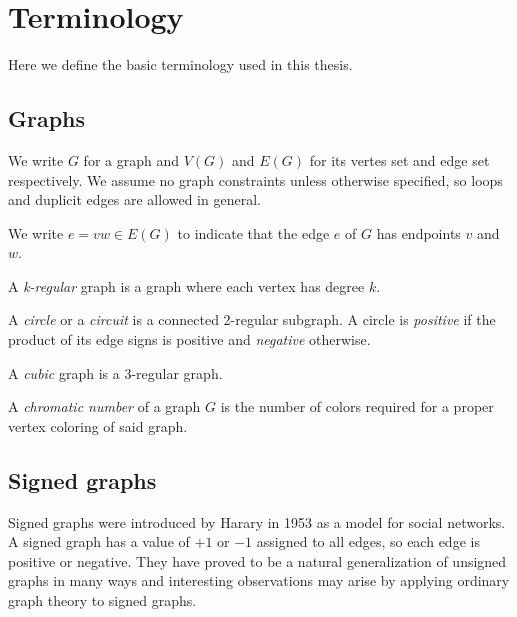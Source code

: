 \chapter{Terminology}\label{ch:terminology}

Here we define the basic terminology used in this thesis.

\section{Graphs}

\begin{definition}
    We write $G$ for a graph and $V(G)$ and $E(G)$ for its vertes set and edge set respectively.
    We assume no graph constraints unless otherwise specified, so loops and duplicit edges are allowed in general.
\end{definition}

\begin{definition}
    We write $e = vw \in E(G)$ to indicate that the edge $e$ of $G$ has endpoints $v$ and $w$.
\end{definition}

\begin{definition}
    A \textit{k-regular} graph is a graph where each vertex has degree $k$.
\end{definition}

\begin{definition}
    A \textit{circle} or a \textit{circuit} is a connected 2-regular subgraph.
    A circle is \textit{positive} if the product of its edge signs is positive and 
    \textit{negative} otherwise.
\end{definition}

\begin{definition}
    A \textit{cubic} graph is a 3-regular graph.
\end{definition}

\begin{definition}
    A \textit{chromatic number} of a graph $G$ is the number of colors required for a proper vertex coloring of said graph.
\end{definition}

\section{Signed graphs}

Signed graphs were introduced by Harary\cite{harary} in 1953 as a model for social networks. 
A signed graph has a value of $+1$ or $-1$ assigned to all edges, so each edge is positive or negative.
They have proved to be a natural generalization of unsigned graphs in many ways and interesting observations may arise
by applying ordinary graph theory to signed graphs.

